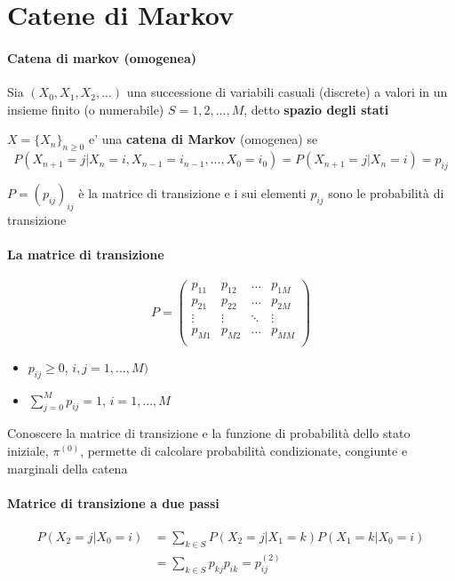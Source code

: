 \chapter{Catene di Markov}

\subsubsection{Catena di markov (omogenea)}
\begin{tcolorbox}
Sia \((X_0,X_1,X_2,...)\)  una successione di variabili casuali (discrete) a valori in un insieme finito (o numerabile) \(S = {1,2,...,M}\), detto \textbf{spazio degli stati}

\(X = \{X_n\}_{n \geq 0}\) e' una \textbf{catena di Markov} (omogenea) se
\[P(X_{n+1} = j | X_n = i, X_{n-1} = i_{n-1},...,X_0 = i_0) = P(X_{n+1} = j | X_n = i) = p_{ij}\]

\(P = (p_{ij})_{ij}\) è la matrice di transizione e i sui elementi \(p_{ij}\) sono le probabilità di transizione
\end{tcolorbox}

\subsubsection{La matrice di transizione}
\[
P = \begin{pmatrix}
p_{11} & p_{12} & \hdots & p_{1M}\\
p_{21} & p_{22} & \hdots & p_{2M}\\
\vdots & \vdots & \ddots & \vdots\\
p_{M1} & p_{M2} & \hdots & p_{MM}\\
\end{pmatrix}
\]
\begin{itemize}
    \item \(p_{ij} \geq 0\), \(i,j = 1,...,M)\)
    \item \(\sum_{j=0}^M p_{ij} = 1\), \(i = 1,...,M\)
\end{itemize}
Conoscere la matrice di transizione e la funzione di probabilità dello stato iniziale, \(\pi^{(0)}\), permette di calcolare probabilità condizionate, congiunte e marginali della catena

\subsubsection{Matrice di transizione a due passi}
\begin{align*}
P(X_2 = j | X_0 = i) &= \sum_{k \in S} P(X_2 = j | X_1 = k)P(X_1 =k | X_0 = i)\\
&= \sum_{k \in S}p_{kj}p_{ik} = p_{ij}^{(2)}
\end{align*}

